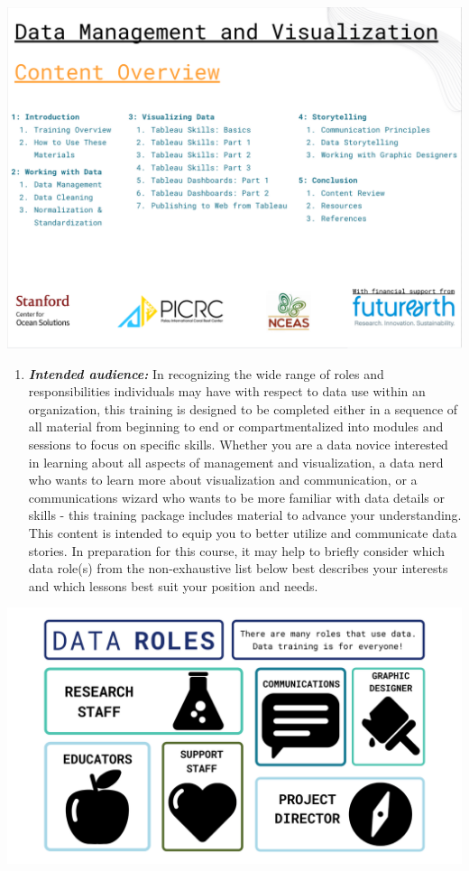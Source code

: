 \documentclass[
]{book}
\providecommand{\tightlist}{%
  \setlength{\itemsep}{0pt}\setlength{\parskip}{0pt}}
\begin{document}
\includegraphics{images/Content_Overview_Intro.png}

\begin{enumerate}
\def\labelenumi{\arabic{enumi}.}
\setcounter{enumi}{3}
\tightlist
\item
  \textbf{\emph{Intended audience:}} In recognizing the wide range of roles and responsibilities individuals may have with respect to data use within an organization, this training is designed to be completed either in a sequence of all material from beginning to end or compartmentalized into modules and sessions to focus on specific skills. Whether you are a data novice interested in learning about all aspects of management and visualization, a data nerd who wants to learn more about visualization and communication, or a communications wizard who wants to be more familiar with data details or skills - this training package includes material to advance your understanding. This content is intended to equip you to better utilize and communicate data stories. In preparation for this course, it may help to briefly consider which data role(s) from the non-exhaustive list below best describes your interests and which lessons best suit your position and needs.
\end{enumerate}

\includegraphics{images/Data_Roles.png}
\end{document}
